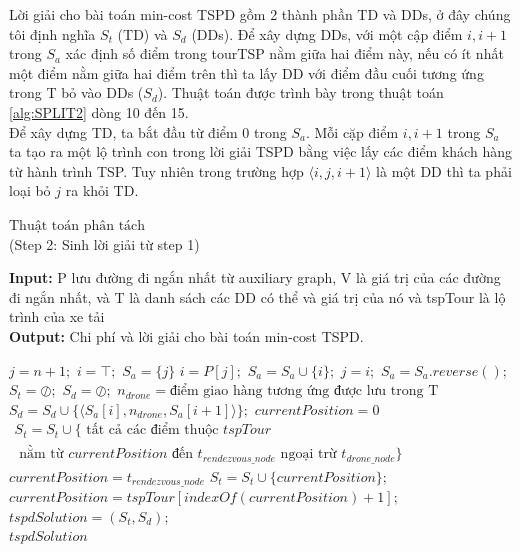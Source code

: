 \documentclass[a4paper,12pt]{report}
\begin{document}
Lời giải cho bài toán min-cost TSPD gồm 2 thành phần TD và DDs, ở đây chúng tôi định nghĩa $S_t$ (TD) và $S_d$ (DDs). Để xây dựng DDs, với một cập điểm $i,i+1$ trong $S_a$ xác định số điểm trong tourTSP nằm giữa hai điểm này, nếu có ít nhất một điểm nằm giữa hai điểm trên thì ta lấy DD với điểm đầu cuối tương ứng trong T bỏ vào DDs ($S_d$). Thuật toán được trình bày trong thuật toán \ref{alg:SPLIT2} dòng 10 đến 15.  \\

Để xây dựng TD, ta bắt đầu từ điểm 0 trong $S_a$. Mỗi cặp điểm $i, i+1$ trong  $S_a$ ta tạo ra một lộ trình con trong lời giải TSPD bằng việc lấy  các điểm khách hàng từ hành trình TSP. Tuy nhiên trong trường hợp $\langle i, j, i+1 \rangle$ là một DD thì ta phải loại bỏ $j$ ra khỏi TD.

\begin{algorithm}
\caption{$\text{Thuật toán phân tách }$ \\ (Step 2: Sinh lời giải từ step 1)}
\textbf{Input:} P lưu đường đi ngắn nhất từ auxiliary graph, V là giá trị của các đường đi ngắn nhất, và T là danh sách các DD có thể và giá trị của nó và tspTour là lộ trình của xe tải\\
\textbf{Output:} Chi phí và lời giải cho bài toán min-cost TSPD.
\begin{algorithmic}[1]
\State $j=n+1;$
\State $i=\top;$
\State $S_a=\{j\}$
\State $i=P[j];$
\State $S_a=S_a \cup \{i\};$
\State $j=i ;$  
\EndWhile
\State $S_a=S_a.reverse();$
\State $S_t=\oslash;$ 
\State $S_d=\oslash;$
\State $n_{drone}=\text{điểm giao hàng tương ứng được lưu trong T} $ 
\State $S_d=S_d \cup \{\langle S_a[i],n_{drone},S_a[i+1] \rangle \};$
\EndIf
\EndFor 
\State $currentPosition=0$
\State $\begin{array}{l}  S_t=S_t\cup \{ \text{ tất cả các điểm thuộc } tspTour \\ \text{ nằm từ } currentPosition \text{ đến } t_{ rendezvous\_node }\text{ ngoại trừ } t_{ drone\_node } \}\end{array}$
\State $currentPosition=t_{rendezvous\_node}$
\Else
\State $S_t=S_t \cup \{currentPosition\} ;$
\State $currentPosition=tspTour[indexOf(currentPosition)+1];$
\EndIf
\EndWhile
\State $tspdSolution=(S_t,S_d);$\\
\Return $tspdSolution$
\end{algorithmic}
\label{alg:SPLIT2}
\end{algorithm}
\end{document}
